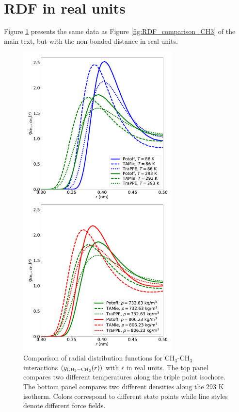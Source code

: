 \documentclass[preprint,review,11pt]{elsarticle}
\begin{document}

    \clearpage
    
    \section{RDF in real units} \label{SI:RDF_real}
    
    Figure \ref{fig:RDF_comparison_CH3_real} presents the same data as Figure \ref{fig:RDF_comparison_CH3} of the main text, but with the non-bonded distance in real units.
    
    \begin{figure}[htb!]
    	\centering
    	\includegraphics[width=3.2in]{RDF_comparison_CH3_real_units.pdf}
    	\caption{Comparison of radial distribution functions for CH$_3$-CH$_3$ interactions $(g_{\rm CH_3-CH_3}(r))$ with $r$ in real units. The top panel compares two different temperatures along the triple point isochore. The bottom panel compares two different densities along the 293 K isotherm. Colors correspond to different state points while line styles denote different force fields.}
    	\label{fig:RDF_comparison_CH3_real}
    \end{figure}
    
\end{document}
